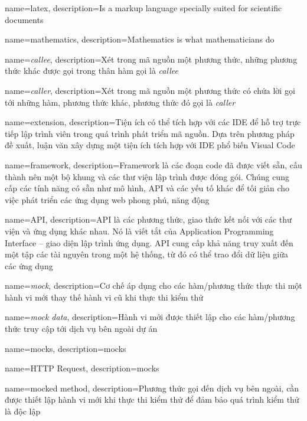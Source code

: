 {
    name=latex,
    description={Is a markup language specially suited 
    for scientific documents}
}

{
    name=mathematics,
    description={Mathematics is what mathematicians do}
}

{
    name=\textit{callee},
    description={Xét trong mã nguồn một phương thức, những phương thức khác được gọi trong thân hàm gọi là \textit{callee}}
}

{
    name=\textit{caller},
    description={Xét trong mã nguồn một phương thức có chứa lời gọi tới những hàm, phương thức khác, phương thức đó gọi là \textit{caller}}
}

{
    name=extension,
    description={Tiện ích có thể tích hợp với các IDE để hỗ trợ trực tiếp lập trình viên trong quá trình phát triển mã nguồn. Dựa trên phương pháp đề xuất, luận văn xây dựng một tiện ích tích hợp với IDE phổ biến Visual Code}
}

{
    name=framework,
    description={Framework là các đoạn code đã được viết sẵn, cấu thành nên một bộ khung và các thư viện lập trình được đóng gói. Chúng cung cấp các tính năng có sẵn như mô hình, API và các yếu tố khác để tối giản cho việc phát triển các ứng dụng web phong phú, năng động}
}

{
    name=API,
    description={API là các phương thức, giao thức kết nối với các thư viện và ứng dụng khác nhau. Nó là viết tắt của Application Programming Interface – giao diện lập trình ứng dụng. API cung cấp khả năng truy xuất đến một tập các tài nguyên trong một hệ thống, từ đó có thể trao đổi dữ liệu giữa các ứng dụng}
}

{
    name=\textit{mock},
    description={Cơ chế áp dụng cho các hàm/phương thức thực thi một hành vi mới thay thế hành vi cũ khi thực thi kiểm thử}
}

{
    name=\textit{mock data},
    description={Hành vi mới được thiết lập cho các hàm/phương thức truy cập tới dịch vụ bên ngoài dự án}
}

{
    name=mocks,
    description={mocks}
}

{
    name=HTTP Request,
    description={mocks}
}

{
    name=mocked method,
    description={Phương thức gọi đến dịch vụ bên ngoài, cần được thiết lập hành vi mới khi thực thi kiểm thử để đảm bảo quá trình kiểm thử là độc lập}
}

